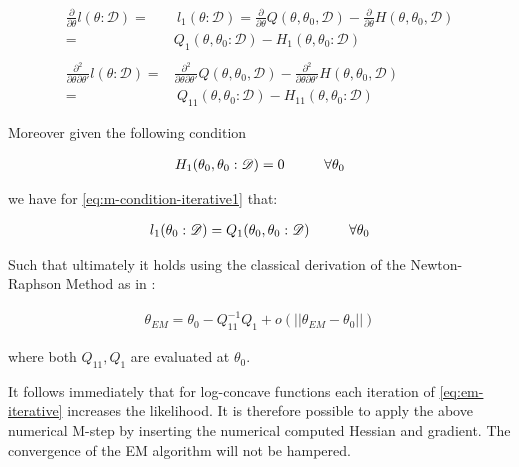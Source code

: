 \documentclass[11pt]{article}
\begin{document}
\begin{article}
\begin{align} 
\frac{\partial}{\partial \theta} l (\theta: \mathscr{D}) =& \ l_1 (\theta: \mathscr{D}) = \frac{\partial}{\partial \theta} Q(\theta, \theta_0, \mathscr{D}) - \frac{\partial}{\partial \theta} H(\theta, \theta_0, \mathscr{D}) \nonumber \\
=& Q_1(\theta, \theta_0 : \mathscr{D}) - H_1(\theta, \theta_0 : \mathscr{D})  \label{eq:m-condition-iterative1} \\
\nonumber \\
\frac{\partial^2}{\partial \theta \partial \theta'} l (\theta: \mathscr{D}) =& \frac{\partial^2}{\partial \theta \partial \theta'}  Q(\theta, \theta_0, \mathscr{D}) -  \frac{\partial^2}{\partial \theta \partial \theta'}  H(\theta, \theta_0, \mathscr{D}) \nonumber \\
  =& \ Q_{11}(\theta, \theta_0 : \mathscr{D}) - H_{11}(\theta, \theta_0 : \mathscr{D}) \label{eq:m-condition-iterative2}
\end{align}

Moreover given the following condition

\begin{align} 
 H_1(\theta_0, \theta_0 : \mathscr{D})  = 0 \hspace*{1cm} \forall \theta_0 \label{eq:m-condition-entropy-iterative}
\end{align}

we have for \ref{eq:m-condition-iterative1} that:

\begin{align} 
 l_1(\theta_0: \mathscr{D})  = Q_1(\theta_0, \theta_0: \mathscr{D}) \hspace*{1cm} \forall \theta_0 \label{eq:m-condition-entropy-iterative2} 
\end{align}

Such that ultimately it holds using the classical derivation of the
Newton-Raphson Method as in \cite{storvik2007numerical}:


\begin{align} 
 \theta_{EM}  = \theta_{0} - Q_{11}^{-1} Q_1 + o(||\theta_{EM} - \theta_{0}||) \label{eq:em-iterative}
\end{align}

where both \(Q_{11}, Q_{1}\) are evaluated at \(\theta_0\).

It follows immediately that for log-concave functions each
iteration of \ref{eq:em-iterative} increases the likelihood. It is
therefore possible to apply the above numerical M-step by inserting
the numerical computed Hessian and gradient. The convergence of the
EM algorithm will not be hampered.


\end{article}
\end{document}
